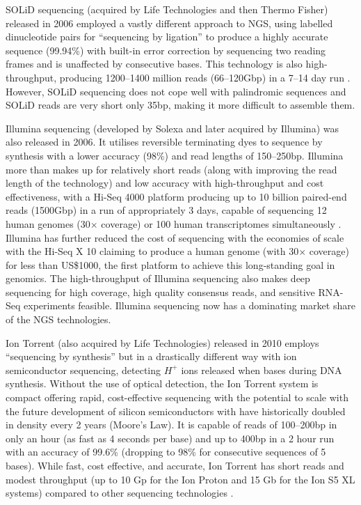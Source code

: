 SOLiD sequencing (acquired by Life Technologies and then Thermo Fisher) released in 2006 employed a vastly different approach to NGS, using labelled dinucleotide pairs for ``sequencing by ligation'' to produce a highly accurate sequence (99.94\%) with built-in error correction by sequencing two reading frames and is unaffected by consecutive bases. This technology is also high-throughput, producing 1200--1400 million reads (66--120Gbp) in a 7--14 day run \citep{solid}. However, SOLiD sequencing does not cope well with palindromic sequences and SOLiD reads are very short only 35bp, making it more difficult to assemble them.

Illumina sequencing (developed by Solexa and later acquired by Illumina) was also released in 2006. It utilises reversible terminating dyes to sequence by synthesis with a lower accuracy (98\%) and read lengths of 150--250bp. Illumina more than makes up for relatively short reads (along with improving the read length of the technology) and low accuracy with high-throughput and cost effectiveness, with a Hi-Seq 4000 platform producing up to 10 billion paired-end reads (1500Gbp) in a run of appropriately 3 days, capable of sequencing 12 human genomes (30$\times$ coverage) or 100 human transcriptomes simultaneously \citep{Illumina}. Illumina has further reduced the cost of sequencing with the economies of scale with the Hi-Seq X 10 claiming to produce a human genome (with 30$\times$ coverage) for less than US\$1000, the first platform to achieve this long-standing goal in genomics. The high-throughput of Illumina sequencing also makes deep sequencing for high coverage, high quality consensus reads, and sensitive RNA-Seq experiments feasible. Illumina sequencing now has a dominating market share of the NGS technologies.


Ion Torrent (also acquired by Life Technologies) released in 2010 employs ``sequencing by synthesis'' but in a drastically different way with ion semiconductor sequencing, detecting $H^+$ ions released when bases during DNA synthesis. Without the use of optical detection, the Ion Torrent system is compact offering rapid, cost-effective sequencing with the potential to scale with the future development of silicon semiconductors with have historically doubled in density every 2 years (Moore's Law). It is capable of reads of 100--200bp in only an hour (as fast as 4 seconds per base) and up to 400bp in a 2 hour run with an accuracy of 99.6\% (dropping to 98\% for consecutive sequences of 5 bases). While fast, cost effective, and accurate, Ion Torrent has short reads and modest throughput (up to 10 Gp for the Ion Proton and 15 Gb for the Ion S5 XL systems) compared to other sequencing technologies \citep{iontorrent}.

